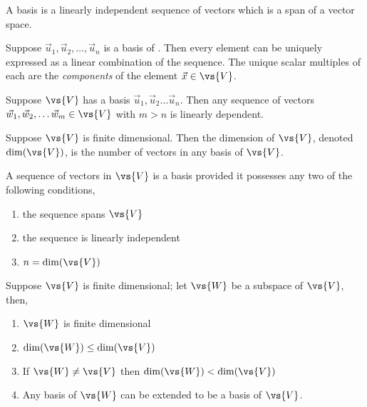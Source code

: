 \begin{definition}[Basis]
  A basis is a linearly independent sequence of vectors which is a
  span of a vector space.
\end{definition}
\begin{lemma}
  Suppose $\vec{u}_1, \vec{u}_2, \dots, \vec{u}_n$ is a basis of
  . Then every element can be uniquely expressed as a linear
  combination of the sequence. The unique scalar multiples of each are the \emph{components} of the element $\vec{x} \in \vs{V}$.
\end{lemma}
\begin{theorem}
  Suppose $\vs{V}$ has a basis $\vec{u}_1, \vec{u}_2 \dots
  \vec{u}_n$. Then any sequence of vectors $\vec{w}_1, \vec{w}_2,
  \dots \vec{w}_m \in \vs{V}$ with $m > n$ is linearly dependent.
\end{theorem}
\begin{definition}
  Suppose $\vs{V}$ is finite dimensional. Then the dimension of $\vs{V}$, denoted $\dim(\vs{V})$, is the number of vectors in any basis of $\vs{V}$.
\end{definition}
\begin{lemma}
  A sequence of vectors in $\vs{V}$ is a basis provided it possesses any two of the following conditions,
  \begin{enumerate}
  \item the sequence spans $\vs{V}$
  \item the sequence is linearly independent
  \item $n = \dim(\vs{V})$
  \end{enumerate}
\end{lemma}
\begin{lemma}
  Suppose $\vs{V}$ is finite dimensional; let $\vs{W}$ be a subspace of $\vs{V}$, then,
  \begin{enumerate}
  \item $\vs{W}$ is finite dimensional
  \item $\dim(\vs{W}) \leq \dim(\vs{V})$
  \item If $\vs{W} \neq \vs{V}$ then $\dim(\vs{W}) < \dim(\vs{V})$
  \item Any basis of $\vs{W}$ can be extended to be a basis of
    $\vs{V}$.
  \end{enumerate}
\end{lemma}

